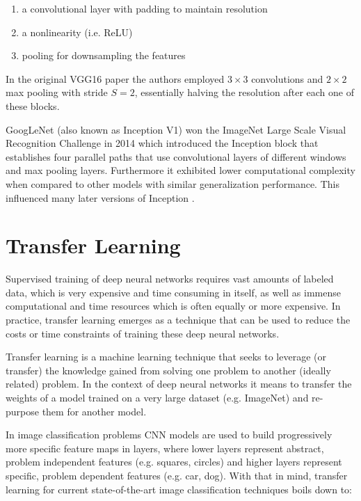 \begin{enumerate}
    \item a convolutional layer with padding to maintain resolution
    \item a nonlinearity (i.e. ReLU)
    \item pooling for downsampling the features
\end{enumerate}

In the original VGG16 paper \cite{vgg16} the authors employed $3 \times 3$ convolutions and $2 \times 2$ max pooling with stride $S = 2$, essentially halving the resolution after each one of these blocks.

GoogLeNet\cite{inceptionv1} (also known as Inception V1) won the ImageNet Large Scale Visual Recognition Challenge \cite{imagenet} in 2014 which introduced the Inception block that establishes four parallel paths that use convolutional layers of different windows and max pooling layers. Furthermore it exhibited lower computational complexity when compared to other models with similar generalization performance. This influenced many later versions of Inception \cite{inceptionv2_3}\cite{inceptionv4}.

\section{Transfer Learning}

Supervised training of deep neural networks requires vast amounts of labeled data, which is very expensive and time consuming in itself, as well as immense computational and time resources which is often equally or more expensive. In practice, transfer learning emerges as a technique that can be used to reduce the costs or time constraints of training these deep neural networks.

Transfer learning is a machine learning technique that seeks to leverage (or transfer) the knowledge gained from solving one problem to another (ideally related) problem. In the context of deep neural networks it means to transfer the weights of a model trained on a very large dataset (e.g. ImageNet\cite{imagenet}) and re-purpose them for another model.

In image classification problems \ac{CNN} models are used to build progressively more specific feature maps in layers, where lower layers represent abstract, problem independent features (e.g. squares, circles) and higher layers represent specific, problem dependent features (e.g. car, dog). With that in mind, transfer learning for current state-of-the-art image classification techniques boils down to:

